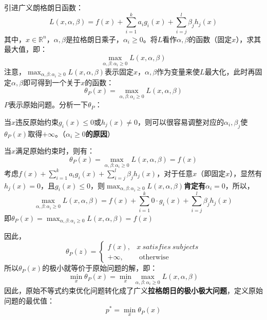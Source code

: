 引进广义朗格朗日函数：
$$
L(x, \alpha, \beta) = f(x) + \sum_{i=1}^k a_i g_i(x) + \sum_{i=j}^l \beta_j h_j(x)
$$
其中，$x \in \mathbb{R}^n$，$\alpha, \beta$是拉格朗日乘子，$\alpha_i \geqslant 0$。将$L$看作$\alpha, \beta$的函数（固定$x$），求其最大值，即：
$$
\mathop{max}_{\alpha, \beta:\alpha_i \geqslant 0} L(x, \alpha, \beta)
$$
注意，$\mathop{max}_{\alpha, \beta:\alpha_i \geqslant 0} L(x, \alpha, \beta)$表示固定$x$，$\alpha, \beta$作为变量来使$L$最大化，此时再固定$\alpha, \beta$即可得到一个关于$x$的函数：
$$
\theta_P (x) = \mathop{max}_{\alpha, \beta:\alpha_i \geqslant 0} L(x, \alpha, \beta)
$$
$P$表示原始问题。分析一下$\theta_P$：
\begin{myitemize}
	\item 当$x$违反原始约束$g_i(x) \leqslant 0$或$h_j(x) \neq 0$，则可以很容易调整对应的$\alpha_i, \beta_j$使$\theta_P(x)$取得$+\infty$。（\textbf{$\alpha_i \geqslant 0$的原因}）
	\item 当$x$满足原始约束时，则有：
	$$
	\theta_P(x) = \mathop{max}_{\alpha, \beta:\alpha_i \geqslant 0} L(x, \alpha, \beta) = f(x)
	$$
	考虑$f(x) + \sum_{i=1}^k a_i g_i(x) + \sum_{i=j}^l \beta_j h_j(x)$，对于任意$x$（即固定$x$），显然有$h_j(x) = 0$，且$g_i(x) \leqslant 0$，则$\mathop{max}_{\alpha, \beta:\alpha_i \geqslant 0} L(x, \alpha, \beta)$\textbf{肯定有$\alpha_i = 0$}，所以，
	$$
	\mathop{max}_{\alpha, \beta:\alpha_i \geqslant 0} L(x, \alpha, \beta) = f(x) + \sum_{i=1}^k 0 \cdot g_i(x) + \sum_{i=j}^l \beta_j h_j(x)
	$$
	即$\theta_P(x) = \mathop{max}_{\alpha, \beta:\alpha_i \geqslant 0} L(x, \alpha, \beta) = f(x)$
\end{myitemize}
因此，
$$
\theta_P(z)= \begin{cases}f(x), & x\ satisfies\ subjects \\ +\infty, & \text { otherwise }\end{cases}
$$
所以$\theta_P(x)$的极小就等价于原始问题的解，即：
$$
\mathop{min}_{x} \theta_P(x) = \mathop{min}_{x} \mathop{max}_{\alpha, \beta: \alpha_i \geqslant 0} L(x, \alpha, \beta)
$$
因此，原始不等式约束优化问题转化成了广义\textbf{拉格朗日的极小极大问题}，定义原始问题的最优值：
$$
p^* = \mathop{min}_{x} \theta_P(x)
$$

